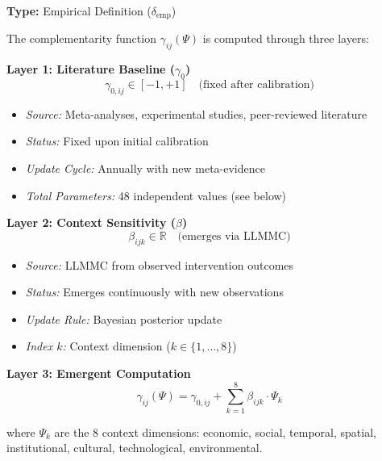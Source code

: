 \begin{tcolorbox}[colback=green!5!white, colframe=green!75!black,
    title=\textbf{Definition EIT-EMP-1-D1: Three-Layer Gamma Architecture}]

\textbf{Type:} Empirical Definition ($\delta_{\text{emp}}$)

The complementarity function $\gamma_{ij}(\Psi)$ is computed through three layers:

\textbf{Layer 1: Literature Baseline ($\gamma_0$)}
\begin{equation}
\gamma_{0,ij} \in [-1, +1] \quad \text{(fixed after calibration)}
\end{equation}
\begin{itemize}[nosep]
    \item \textit{Source:} Meta-analyses, experimental studies, peer-reviewed literature
    \item \textit{Status:} Fixed upon initial calibration
    \item \textit{Update Cycle:} Annually with new meta-evidence
    \item \textit{Total Parameters:} 48 independent values (see below)
\end{itemize}

\textbf{Layer 2: Context Sensitivity ($\beta$)}
\begin{equation}
\beta_{ijk} \in \mathbb{R} \quad \text{(emerges via LLMMC)}
\end{equation}
\begin{itemize}[nosep]
    \item \textit{Source:} LLMMC from observed intervention outcomes
    \item \textit{Status:} Emerges continuously with new observations
    \item \textit{Update Rule:} Bayesian posterior update
    \item \textit{Index $k$:} Context dimension ($k \in \{1, \ldots, 8\}$)
\end{itemize}

\textbf{Layer 3: Emergent Computation}
\begin{equation}
\boxed{\gamma_{ij}(\Psi) = \gamma_{0,ij} + \sum_{k=1}^{8} \beta_{ijk} \cdot \Psi_k}
\label{eq:gamma-emergence-main}
\end{equation}

where $\Psi_k$ are the 8 context dimensions: economic, social, temporal, spatial, institutional, cultural, technological, environmental.

\end{tcolorbox}

